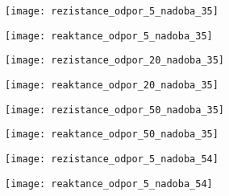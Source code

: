 \begin{figure}
\centering
\begin{minipage}{.5\textwidth}
  \centering
  \texttt{[image: rezistance\_odpor\_5\_nadoba\_35]}
\captionsetup{justification=centering}
\end{minipage}%
\begin{minipage}{.5\textwidth}
  \centering
  \texttt{[image: reaktance\_odpor\_5\_nadoba\_35]}
\captionsetup{justification=centering}
\end{minipage}
\end{figure}

\begin{figure}
\centering
\begin{minipage}{.5\textwidth}
  \centering
  \texttt{[image: rezistance\_odpor\_20\_nadoba\_35]}
\captionsetup{justification=centering}
\end{minipage}%
\begin{minipage}{.5\textwidth}
  \centering
  \texttt{[image: reaktance\_odpor\_20\_nadoba\_35]}
\captionsetup{justification=centering}
\end{minipage}
\end{figure}

\begin{figure}
\centering
\begin{minipage}{.5\textwidth}
  \centering
  \texttt{[image: rezistance\_odpor\_50\_nadoba\_35]}
\captionsetup{justification=centering}
\end{minipage}%
\begin{minipage}{.5\textwidth}
  \centering
  \texttt{[image: reaktance\_odpor\_50\_nadoba\_35]}
\captionsetup{justification=centering}
\end{minipage}
\end{figure}




\begin{figure}
\centering
\begin{minipage}{.5\textwidth}
  \centering
  \texttt{[image: rezistance\_odpor\_5\_nadoba\_54]}
\captionsetup{justification=centering}
\label{rezistance_odpor_5_nadoba_54}
\end{minipage}%
\begin{minipage}{.5\textwidth}
  \centering
  \texttt{[image: reaktance\_odpor\_5\_nadoba\_54]}
\captionsetup{justification=centering}
\end{minipage}
\end{figure}

